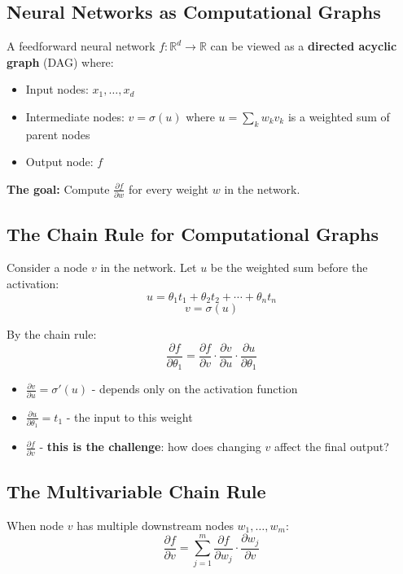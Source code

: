 \documentclass[main.tex]{subfiles}
\begin{document}
\subsection{Neural Networks as Computational Graphs}

A feedforward neural network $f: \mathbb{R}^d \to \mathbb{R}$ can be viewed as a \textbf{directed acyclic graph} (DAG) where:
\begin{itemize}
    \item Input nodes: $x_1, \ldots, x_d$
    \item Intermediate nodes: $v = \sigma(u)$ where $u = \sum_k w_k v_k$ is a weighted sum of parent nodes
    \item Output node: $f$
\end{itemize}

\textbf{The goal:} Compute $\frac{\partial f}{\partial w}$ for every weight $w$ in the network.

\subsection{The Chain Rule for Computational Graphs}

Consider a node $v$ in the network. Let $u$ be the weighted sum before the activation:
$$u = \theta_1 t_1 + \theta_2 t_2 + \cdots + \theta_n t_n$$
$$v = \sigma(u)$$

By the chain rule:
$$\frac{\partial f}{\partial \theta_1} = \frac{\partial f}{\partial v} \cdot \frac{\partial v}{\partial u} \cdot \frac{\partial u}{\partial \theta_1}$$

\begin{itemize}
    \item $\frac{\partial v}{\partial u} = \sigma'(u)$ - depends only on the activation function
    \item $\frac{\partial u}{\partial \theta_1} = t_1$ - the input to this weight
    \item $\frac{\partial f}{\partial v}$ - \textbf{this is the challenge}: how does changing $v$ affect the final output?
\end{itemize}

\subsection{The Multivariable Chain Rule}

When node $v$ has multiple downstream nodes $w_1, \ldots, w_m$:
$$\frac{\partial f}{\partial v} = \sum_{j=1}^{m} \frac{\partial f}{\partial w_j} \cdot \frac{\partial w_j}{\partial v}$$
\end{document}
